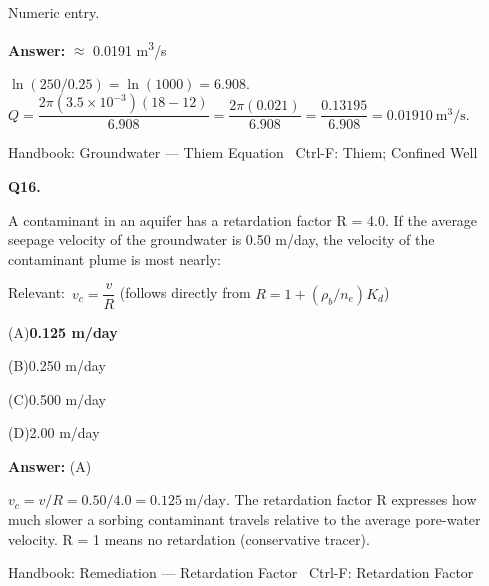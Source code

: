 \documentclass[11pt]{article}
\newcommand{\correct}[1]{\textbf{#1}\;{\color{accent}$\checkmark$}}
\newcommand{\optline}[2]{\par\noindent\hspace{1.2em}(#1)\hspace{0.6em}#2}
\begin{document}
{\small\color{soft}Numeric entry.}\par\vspace{3pt}
\vspace{2pt}\par\noindent\colorbox{boxbg}{\parbox{\dimexpr\linewidth-2\fboxsep\relax}{%
\vspace{2pt}\textbf{Answer:} $\approx$ 0.0191 m\textsuperscript{3}/s\par\vspace{2pt}
{\small $\ln(250/0.25) = \ln(1000) = 6.908$.  $Q = \dfrac{2\pi(3.5\times10^{-3})(18-12)}{6.908} = \dfrac{2\pi(0.021)}{6.908} = \dfrac{0.13195}{6.908} = 0.01910\ \mathrm{m^3/s}$.}\par\vspace{2pt}
{\footnotesize\color{soft}Handbook: Groundwater --- Thiem Equation \textbullet\ Ctrl-F: Thiem; Confined Well}\vspace{2pt}
}}
\vspace{9pt}
\filbreak
\textbf{\color{accent}Q16.}\par\vspace{2pt}
A contaminant in an aquifer has a retardation factor R = 4.0. If the average seepage velocity of the groundwater is 0.50 m/day, the velocity of the contaminant plume is most nearly:\par\vspace{3pt}
{\small\color{soft}Relevant:}\ $v_c = \dfrac{v}{R}$  (follows directly from $R = 1 + (\rho_b/n_e)K_d$)\par\vspace{3pt}
\optline{A}{\correct{0.125 m/day}}
\optline{B}{0.250 m/day}
\optline{C}{0.500 m/day}
\optline{D}{2.00 m/day}
\par\vspace{3pt}
\vspace{2pt}\par\noindent\colorbox{boxbg}{\parbox{\dimexpr\linewidth-2\fboxsep\relax}{%
\vspace{2pt}\textbf{Answer:} (A)\par\vspace{2pt}
{\small $v_c = v/R = 0.50/4.0 = 0.125\ \mathrm{m/day}$. The retardation factor R expresses how much slower a sorbing contaminant travels relative to the average pore-water velocity. R = 1 means no retardation (conservative tracer).}\par\vspace{2pt}
{\footnotesize\color{soft}Handbook: Remediation --- Retardation Factor \textbullet\ Ctrl-F: Retardation Factor}\vspace{2pt}
}}
\end{document}
